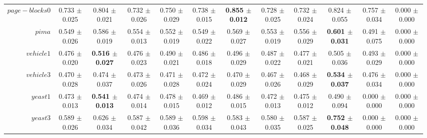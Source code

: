 \begin{table}[!ht]
{\begin{tabular}{r c c c c c c c c c c c}
$page-blocks0$ & 0.733 $\pm$ 0.025 & 0.804 $\pm$ 0.021 & 0.732 $\pm$ 0.026 & 0.750 $\pm$ 0.029 & 0.738 $\pm$ 0.015 & \textbf{0.855 $\pm$ 0.012} & 0.728 $\pm$ 0.025 & 0.732 $\pm$ 0.024 & 0.824 $\pm$ 0.055 & 0.757 $\pm$ 0.034 & 0.000 $\pm$ 0.000 \\
$pima$ & 0.549 $\pm$ 0.026 & 0.586 $\pm$ 0.019 & 0.554 $\pm$ 0.013 & 0.552 $\pm$ 0.019 & 0.549 $\pm$ 0.022 & 0.569 $\pm$ 0.027 & 0.553 $\pm$ 0.019 & 0.556 $\pm$ 0.029 & \textbf{0.601 $\pm$ 0.031} & 0.491 $\pm$ 0.075 & 0.000 $\pm$ 0.000 \\
$vehicle1$ & 0.476 $\pm$ 0.020 & \textbf{0.516 $\pm$ 0.027} & 0.476 $\pm$ 0.023 & 0.490 $\pm$ 0.021 & 0.486 $\pm$ 0.018 & 0.496 $\pm$ 0.029 & 0.487 $\pm$ 0.022 & 0.477 $\pm$ 0.021 & 0.505 $\pm$ 0.036 & 0.493 $\pm$ 0.029 & 0.000 $\pm$ 0.000 \\
$vehicle3$ & 0.470 $\pm$ 0.028 & 0.474 $\pm$ 0.037 & 0.473 $\pm$ 0.026 & 0.471 $\pm$ 0.028 & 0.472 $\pm$ 0.024 & 0.470 $\pm$ 0.029 & 0.467 $\pm$ 0.026 & 0.468 $\pm$ 0.029 & \textbf{0.534 $\pm$ 0.037} & 0.476 $\pm$ 0.034 & 0.000 $\pm$ 0.000 \\
$yeast1$ & 0.473 $\pm$ 0.013 & \textbf{0.541 $\pm$ 0.013} & 0.474 $\pm$ 0.014 & 0.478 $\pm$ 0.015 & 0.469 $\pm$ 0.012 & 0.486 $\pm$ 0.015 & 0.472 $\pm$ 0.013 & 0.475 $\pm$ 0.012 & 0.490 $\pm$ 0.094 & 0.000 $\pm$ 0.000 & 0.000 $\pm$ 0.000 \\
$yeast3$ & 0.589 $\pm$ 0.026 & 0.626 $\pm$ 0.034 & 0.587 $\pm$ 0.042 & 0.589 $\pm$ 0.036 & 0.598 $\pm$ 0.034 & 0.583 $\pm$ 0.043 & 0.580 $\pm$ 0.035 & 0.587 $\pm$ 0.025 & \textbf{0.752 $\pm$ 0.048} & 0.000 $\pm$ 0.000 & 0.000 $\pm$ 0.000 \\
\end{tabular}}
\end{table}

